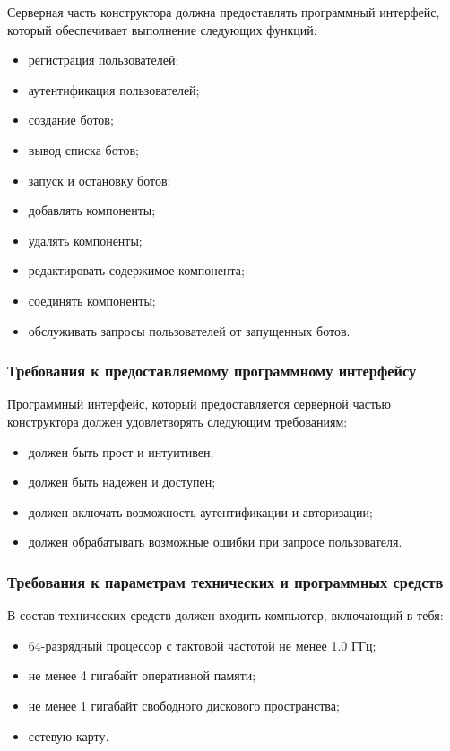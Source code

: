 Серверная часть конструктора должна предоставлять программный
интерфейс, который обеспечивает выполнение следующих функций:
\begin{itemize}
	\item регистрация пользователей;
	\item аутентификация пользователей;
	\item создание ботов;
	\item вывод списка ботов;
	\item запуск и остановку ботов;
	\item добавлять компоненты;
	\item удалять компоненты;
	\item редактировать содержимое компонента;
	\item соединять компоненты;
	\item обслуживать запросы пользователей от запущенных ботов.
\end{itemize}

\subsubsection{Требования к предоставляемому программному интерфейсу}

Программный интерфейс, который предоставляется серверной частью
конструктора должен удовлетворять следующим требованиям:
\begin{itemize}
	\item должен быть прост и интуитивен;
	\item должен быть надежен и доступен;
	\item должен включать возможность аутентификации и авторизации;
	\item должен обрабатывать возможные ошибки при запросе
	      пользователя.
\end{itemize}

\subsubsection{Требования к параметрам технических и программных средств}

В состав технических средств должен входить компьютер, включающий
в тебя:
\begin{itemize}
	\item 64-разрядный процессор с тактовой частотой не менее 1.0 ГГц;
	\item не менее 4 гигабайт оперативной памяти;
	\item не менее 1 гигабайт свободного дискового пространства;
	\item сетевую карту.
\end{itemize}

